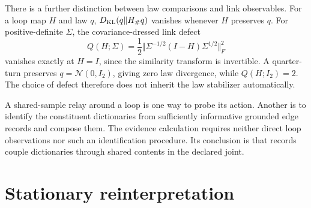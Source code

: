 \documentclass[11pt,letterpaper]{report}
\begin{document}
There is a further distinction between law comparisons and link observables. For a loop map $H$ and law $q$, $D_{\mathrm{KL}}(q\Vert H_\#q)$ vanishes whenever $H$ preserves $q$. For positive-definite $\Sigma$, the covariance-dressed link defect
\begin{equation}
Q(H;\Sigma)=\frac12\Vert\Sigma^{-1/2}(I-H)\Sigma^{1/2}\Vert_F^2
\label{it3:link-defect}
\end{equation}
vanishes exactly at $H=I$, since the similarity transform is invertible. A quarter-turn preserves $q=\mathcal N(0,I_2)$, giving zero law divergence, while $Q(H;I_2)=2$. The choice of defect therefore does not inherit the law stabilizer automatically.

A shared-sample relay around a loop is one way to probe its action. Another is to identify the constituent dictionaries from sufficiently informative grounded edge records and compose them. The evidence calculation requires neither direct loop observations nor such an identification procedure. Its conclusion is that records couple dictionaries through shared contents in the declared joint.

\chapter{Stationary reinterpretation}
\label{it3:ch-stationary}
\end{document}
